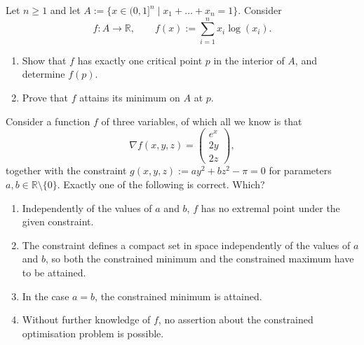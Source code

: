 \begin{exercise}
\label{ex:entropy_simplex_minimum}
Let $n \ge 1$ and let $A := \{x \in (0,1]^n \mid x_1 + \dots + x_n = 1\}$. Consider
\[f : A \to \mathbb{R}, \qquad f(x) := \sum_{i=1}^n x_i \log(x_i).\]
\begin{enumerate}[label=\textbf{(\alph*)}]
  \item Show that $f$ has exactly one critical point $p$ in the interior of $A$, and determine
    $f(p)$.
  \item Prove that $f$ attains its minimum on $A$ at $p$.
\end{enumerate}
\end{exercise}

\begin{exercise}
\label{ex:kobel_lagrange_single_choice}
Consider a function $f$ of three variables, of which all we know is that
\[\nabla f(x,y,z) = \begin{pmatrix} e^x \\ 2y \\ 2z \end{pmatrix},\]
together with the constraint $g(x,y,z) := ay^2 + bz^2 - \pi = 0$ for parameters
$a,b \in \mathbb{R}\setminus\{0\}$. Exactly one of the following is correct. Which?
\begin{enumerate}[label=\textbf{(\alph*)}]
  \item Independently of the values of $a$ and $b$, $f$ has no extremal point under the given
    constraint.
  \item The constraint defines a compact set in space independently of the values of $a$ and $b$,
    so both the constrained minimum and the constrained maximum have to be attained.
  \item In the case $a = b$, the constrained minimum is attained.
  \item Without further knowledge of $f$, no assertion about the constrained optimisation problem
    is possible.
\end{enumerate}
\end{exercise}

